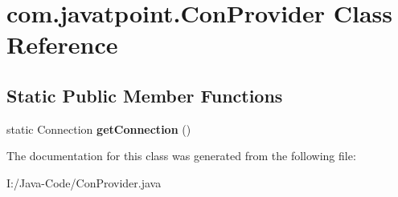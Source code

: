\hypertarget{classcom_1_1javatpoint_1_1_con_provider}{}\section{com.\+javatpoint.\+Con\+Provider Class Reference}
\label{classcom_1_1javatpoint_1_1_con_provider}
\subsection*{Static Public Member Functions}
\begin{DoxyCompactItemize}
\item 
\mbox{\label{classcom_1_1javatpoint_1_1_con_provider_a22de7d4b77ced0183892fc465fb308d6}} 
static Connection {\bfseries get\+Connection} ()
\end{DoxyCompactItemize}


The documentation for this class was generated from the following file\+:\begin{DoxyCompactItemize}
\item 
I\+:/\+Java-\/\+Code/Con\+Provider.\+java\end{DoxyCompactItemize}
